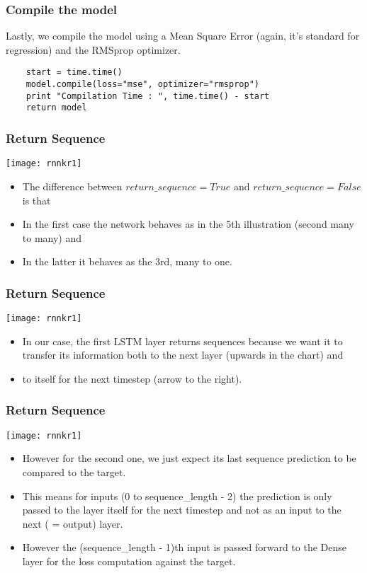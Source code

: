 \begin{frame}[fragile] \frametitle{Compile the model}
Lastly, we compile the model using a Mean Square Error (again, it's standard for regression) and the RMSprop optimizer.
\begin{lstlisting}
    start = time.time()
    model.compile(loss="mse", optimizer="rmsprop")
    print "Compilation Time : ", time.time() - start
    return model
\end{lstlisting}    
\end{frame}

\begin{frame}[fragile] \frametitle{Return Sequence}
\begin{center}
\texttt{[image: rnnkr1]}
\end{center}
\begin{itemize}
\item The difference between $return\_sequence=True$ and $return\_sequence=False$ is that 
\item In the first case the network behaves as in the 5th illustration (second many to many) and
\item In the latter it behaves as the 3rd, many to one.
\end{itemize}
\end{frame}

\begin{frame}[fragile] \frametitle{Return Sequence}
\begin{center}
\texttt{[image: rnnkr1]}
\end{center}
\begin{itemize}
\item In our case, the first LSTM layer returns sequences because we want it to transfer its information both to the next layer (upwards in the chart) and 
\item to itself for the next timestep (arrow to the right).
\end{itemize}
\end{frame}

\begin{frame}[fragile] \frametitle{Return Sequence}
\begin{center}
\texttt{[image: rnnkr1]}
\end{center}
\begin{itemize}
\item However for the second one, we just expect its last sequence prediction to be compared to the target. 
\item This means for inputs (0 to sequence\_length - 2) the prediction is only passed to the layer itself for the next timestep and not as an input to the next ( = output) layer.
\item However the (sequence\_length - 1)th input is passed forward to the Dense layer for the loss computation against the target.
\end{itemize}
\end{frame}


